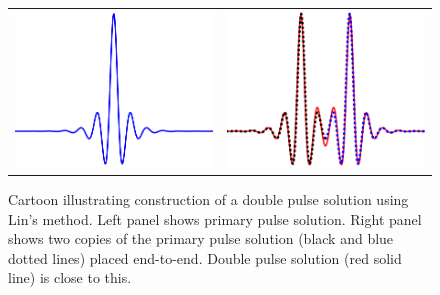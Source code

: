 \documentclass[12pt,reqno,oneside,hidelinks]{article}
\begin{document}
\begin{figure}
    \centering
    \begin{tabular}{cc}
        \includegraphics[width=6cm]{images/linchen1.png} &
        \includegraphics[width=6cm]{images/linchen2.png} 
    \end{tabular}
    \caption{Cartoon illustrating construction of a double pulse solution using Lin's method. Left panel shows primary pulse solution. Right panel shows two copies of the primary pulse solution (black and blue dotted lines) placed end-to-end. Double pulse solution (red solid line) is close to this.}
    \label{fig:linsmethod}
\end{figure}
\end{document}

